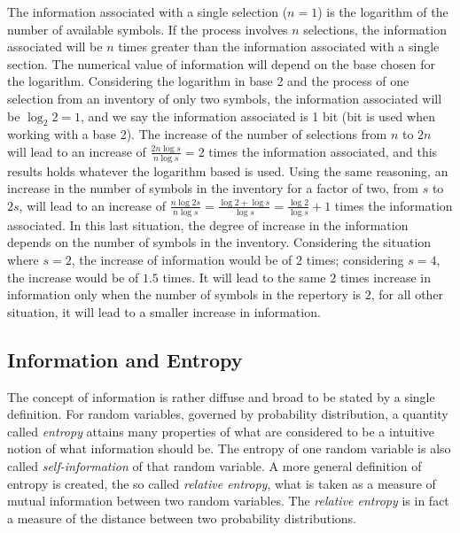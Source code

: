 The information associated with a single selection ($n=1$) is the logarithm of the number of available symbols. 
If the process involves $n$ selections, the information associated will be $n$ times greater than 
the information associated with a single section. The numerical value of information will depend on 
the base chosen for the logarithm. Considering the logarithm in base 2 and the process of one selection 
from an inventory of only two symbols, the information associated will be $\log_2 2 = 1$, and we say 
the information associated is 1 bit (bit is used when working with a base 2). The increase of the number of 
selections from $n$ to $2n$ will lead to an increase of $\frac{2n \log s}{n \log s} = 2$ times the information 
associated, and this results holds whatever the logarithm based is used. Using the same reasoning, 
an increase in the number of symbols in the inventory for a factor of two, from $s$ to $2s$, 
will lead to an increase of $\frac{n \log 2s}{n \log s} = \frac{\log 2 + \log s}{\log s} = \frac{\log 2}{\log s}+1$ 
times the information associated. In this last situation, the degree of increase in the information depends on 
the number of symbols in the inventory. Considering the situation where $s = 2$, the increase of information 
would be of $2$ times; considering $s = 4$, the increase would be of $1.5$ times. 
It will lead to the same $2$ times increase in information only when the number of symbols in the repertory is $2$, 
for all other situation, it will lead to a smaller increase in information.




\subsection{Information and Entropy}
The concept of information is rather diffuse and broad to be stated by a single definition. 
For random variables, governed by probability distribution, a quantity called \textit{entropy} 
attains many properties of what are considered to be a intuitive notion of what information should be. 
The entropy of one random variable is also called \textit{self-information} of that random variable. 
A more general definition of entropy is created, the so called \textit{relative entropy}, 
what is taken as a measure of mutual information between two random variables. 
The \textit{relative entropy} is in fact a measure of the distance between two probability distributions.

